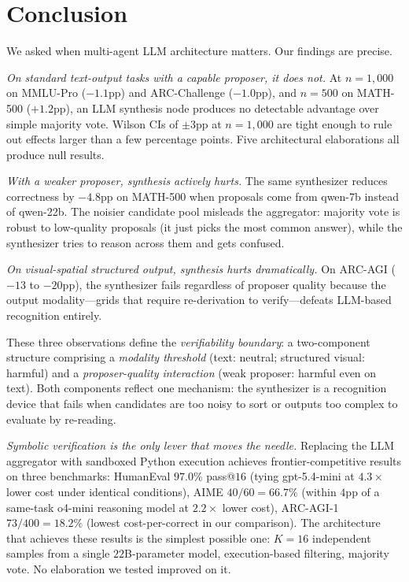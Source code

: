 \documentclass[11pt]{amsart}
\newcommand\1{{\mathds{1}}}
\theoremstyle{definition}
\theoremstyle{remark}
\numberwithin{equation}{section}
\begin{document}
\section{Conclusion}\label{sec:conclusion}

We asked when multi-agent LLM architecture matters.
Our findings are precise.

\emph{On standard text-output tasks with a capable proposer, it does not.}
At $n\!=\!1{,}000$ on MMLU-Pro ($-1.1$pp) and ARC-Challenge ($-1.0$pp), and $n\!=\!500$ on MATH-500 ($+1.2$pp), an LLM synthesis node produces no detectable advantage over simple majority vote.
Wilson CIs of $\pm 3$pp at $n\!=\!1{,}000$ are tight enough to rule out effects larger than a few percentage points.
Five architectural elaborations all produce null results.

\emph{With a weaker proposer, synthesis actively hurts.}
The same synthesizer reduces correctness by $-4.8$pp on MATH-500 when proposals come from qwen-7b instead of qwen-22b.
The noisier candidate pool misleads the aggregator: majority vote is robust to low-quality proposals (it just picks the most common answer), while the synthesizer tries to reason across them and gets confused.

\emph{On visual-spatial structured output, synthesis hurts dramatically.}
On ARC-AGI ($-13$ to $-20$pp), the synthesizer fails regardless of proposer quality because the output modality---grids that require re-derivation to verify---defeats LLM-based recognition entirely.

These three observations define the \emph{verifiability boundary}: a two-component structure comprising a \emph{modality threshold} (text: neutral; structured visual: harmful) and a \emph{proposer-quality interaction} (weak proposer: harmful even on text).
Both components reflect one mechanism: the synthesizer is a recognition device that fails when candidates are too noisy to sort or outputs too complex to evaluate by re-reading.

\emph{Symbolic verification is the only lever that moves the needle.}
Replacing the LLM aggregator with sandboxed Python execution achieves frontier-competitive results on three benchmarks:
HumanEval $97.0\%$ pass@$16$ (tying gpt-5.4-mini at $4.3\times$ lower cost under identical conditions),
AIME $40/60 = 66.7\%$ (within $4$pp of a same-task o4-mini reasoning model at $2.2\times$ lower cost),
ARC-AGI-1 $73/400 = 18.2\%$ (lowest cost-per-correct in our comparison).
The architecture that achieves these results is the simplest possible one: $K\!=\!16$ independent samples from a single $22$B-parameter model, execution-based filtering, majority vote.
No elaboration we tested improved on it.
\end{document}
